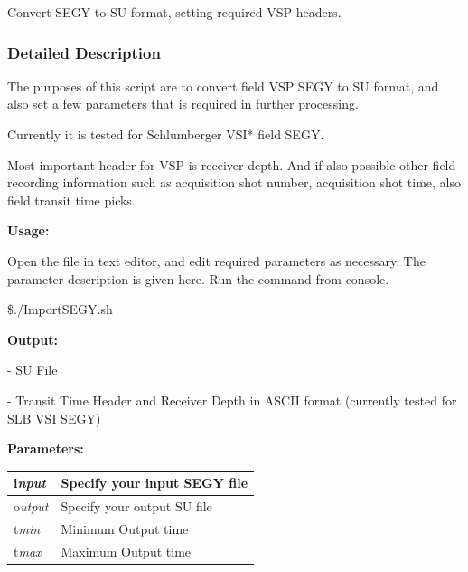\documentclass{article}
\begin{document}
\vspace{12pt}
Convert SEGY to SU format, setting required VSP headers. 

\vspace{24pt}
\subsubsection*{\textbf{Detailed Description}}

\vspace{1pt}
The purposes of this script are to convert field VSP SEGY to SU format, and also 
set a few parameters that is required in further processing. 

\vspace{1pt}
Currently it is tested for Schlumberger VSI* field SEGY. 

\vspace{1pt}
Most important header for VSP is receiver depth. And if also possible other field 
recording information such as acquisition shot number, acquisition shot time, also 
field transit time picks. 

\vspace{4pt}
\textbf{Usage:}

\vspace{4pt}
Open the file in text editor, and edit required parameters as necessary. The parameter 
description is given here. Run the command from console. 

\vspace{16pt}
\$./ImportSEGY.sh 

\vspace{4pt}
\textbf{Output:}

\vspace{4pt}
- SU File 

\vspace{4pt}
- Transit Time Header and Receiver Depth in ASCII format (currently tested for 
SLB VSI SEGY)

\vspace{4pt}
\textbf{Parameters:}

\vspace{4pt}
\begin{tabular}{|>{\raggedright}p{54pt}|>{\raggedright}p{245pt}|}
\hline
i\textit{nput}  & Specify your input SEGY file \tabularnewline
\hline
o\textit{utput}  & Specify your output SU file \tabularnewline
\hline
t\textit{min}  & Minimum Output time \tabularnewline
\hline
t\textit{max}  & Maximum Output time \tabularnewline
\hline
\end{tabular}
\end{document}
